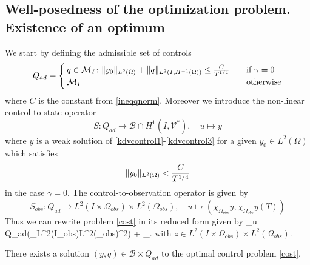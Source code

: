 \subsection{Well-posedness of the optimization problem. Existence of an optimum}
We start by defining the admissible set of controls
$$Q_{ad} = \begin{cases} q \in \mathcal{M}_I\colon \lVert y_0\rVert_{L^2(\Omega)}+\lVert q\rVert_{L^{2}(I,H^{-1}(\Omega))} \leq \frac{C}{T^{1/4}} &\quad\mbox{if } \gamma = 0 \\
\mathcal{M}_I & \quad \mbox{otherwise}
 \end{cases}$$
where $C$ is the constant from \eqref{ineqqnorm}. Moreover we introduce the non-linear control-to-state operator 
\[S\colon Q_{ad}\rightarrow \mathcal B\cap H^1(I,\mathcal V^\ast),\quad u\mapsto y\]
where $y$ is a weak solution of \eqref{kdvcontrol1}-\eqref{kdvcontrol3} for a given $y_0\in L^2(\Omega)$ which satisfies 
\[
\lVert y_0\rVert_{L^2(\Omega)}< \frac{C}{T^{1/4}}
\]
in the case $\gamma =0$. The control-to-observation operator is given by 
\[
S_{obs}\colon Q_{ad}\rightarrow L^2(I\times \Omega_{obs})\times L^2(\Omega_{obs}),\quad u\mapsto(\chi_{\Omega_{obs}}y,\chi_{\Omega_{obs}}y(T)) 
\] 
Thus we can rewrite problem \eqref{cost} in its reduced form given by 
\be
\min_{u \in Q_{ad}}\left(_{L^2(I\times \Omega_{obs})\times L^2(\Omega_{obs})}^2\right) + \alpha {}_{\M}.
\label{red cost}
\ee
with $z\in L^2(I\times \Omega_{obs})\times L^2(\Omega_{obs})$. 
\begin{prop}
There exists a solution $(\bar y,\bar q) \in \mathcal B\times Q_{ad}$ to the optimal control problem \eqref{cost}.
\end{prop}

